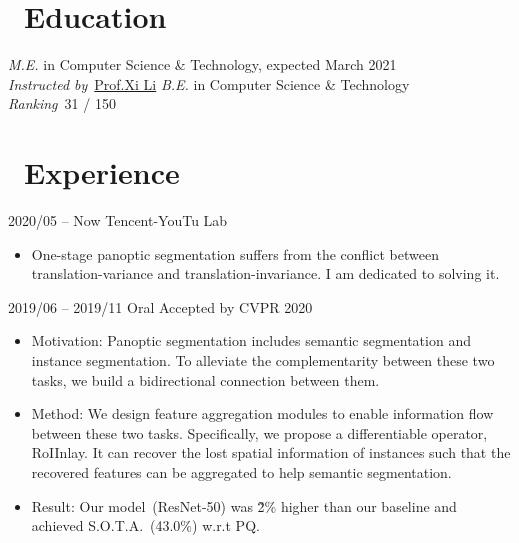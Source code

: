 \documentclass{resume}
\begin{document}

\section{\faGraduationCap\ Education}
\textit{M.E.} in  Computer Science \& Technology, expected March 2021\\
\textit{Instructed by}\ \href{https://person.zju.edu.cn/xilics}{Prof.Xi Li}
\textit{B.E.} in Computer Science \& Technology\\
\textit{Ranking}\ 31 / 150

\section{\faUsers\ Experience}
 {2020/05 -- Now}
\vspace{-0.3em}
 {Tencent-YouTu Lab}
\vspace{-0.5em}
\begin{itemize}
\item One-stage panoptic segmentation suffers from the conflict between translation-variance and translation-invariance. I am dedicated to solving it.
\end{itemize}

 {2019/06 -- 2019/11} 
\vspace{-0.3em}
 {Oral Accepted by CVPR 2020}
\vspace{-0.5em}
\begin{itemize}
	\item Motivation: Panoptic segmentation includes semantic segmentation and instance segmentation. To alleviate the complementarity between these two tasks, we build a bidirectional connection between them. %
	\item Method: We design feature aggregation modules to enable information flow between these two tasks. Specifically, we propose a differentiable operator, RoIInlay. It can recover the lost spatial information of instances such that the recovered features can be aggregated to help semantic segmentation. 
	\item Result: Our model~(ResNet-50) was \~2\% higher than our baseline and achieved S.O.T.A.~(43.0\%) w.r.t PQ. 
\end{itemize}
\end{document}
